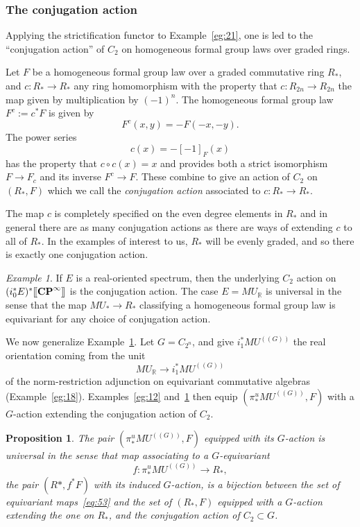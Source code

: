 \documentclass{amsart}
\newtheorem{prop}[equation]{Proposition}
\theoremstyle{definition}
\theoremstyle{remark}
\newtheorem{eg}[equation]{Example}
\newcommand{\R}{{\mathbb R}}
\newcommand{\LL}{[\mkern-2mu[}
\newcommand{\RR}{]\mkern-2mu]}
\newcommand{\cp}{\mathbf{CP}}
\newcommand{\mur}{MU_{\R}}
\newcommand{\mutn}[1]{MU^{(\!(#1)\!)}}
\newcommand{\piu}{\pi^{u}}
\newcommand{\zt}{C_{2}}
\newcommand{\ztn}{C_{2^{n}}}
\newcommand{\mustar}{MU_{\ast}}
\begin{document}
\subsubsection{The conjugation action}
\label{sec:conjugation-action}

Applying the strictification functor to Example~\ref{eg:21}, one is
led to the ``conjugation action'' of $\zt$ on homogeneous formal group
laws over graded rings.

Let $F$ be a homogeneous formal group law over a graded
commutative ring $R_{\ast}$, and $c:R_{\ast}\to R_{\ast}$ any ring
homomorphism with the property that $c:R_{2n}\to R_{2n}$ the map given
by multiplication by $(-1)^{n}$.  The homogeneous formal group law
$F^{c}:= c^{\ast}F$ is given by
\[
F^{c}(x,y) = - F(-x, -y).
\]
The power series
\[
c(x) = - [-1]_{F}(x)
\]
has the property that $c\circ c(x)=x$ and provides both a strict
isomorphism $F\to F_{c}$ and its inverse $F^{c}\to F$.  These combine
to give an action of $\zt$ on $(R_{\ast},F)$ which we call the {\em
conjugation action} associated to $c:R_{\ast}\to R_{\ast}$.


The map $c$ is completely specified on the even degree elements in
$R_{\ast}$ and in general there are as many conjugation actions as
there are ways of extending $c$ to all of $R_{\ast}$.  In the examples
of interest to us, $R_{\ast}$ will be evenly graded, and so there is
exactly one conjugation action.


\begin{eg}
\label{eg:22} 
If $E$ is a real-oriented spectrum, then the underlying
$\zt$ action on $(i_{0}^{\ast}E)^{\ast}\LL \cp^{\infty}\RR$ is the
conjugation action.  The case $E=\mur$ is universal in the sense that
the map $\mustar\to R_{\ast}$ classifying a homogeneous formal group
law is equivariant for any choice of conjugation action.
\end{eg}

We now generalize Example~\ref{eg:22}.  Let $G=\ztn$, and give
$i_{1}^{\ast}\mutn{G}$ the real orientation coming from the unit
\[
\mur\to i_{1}^{\ast}\mutn{G}
\]
of the norm-restriction adjunction on equivariant commutative
algebras (Example~\ref{eg:18}).   Examples~\ref{eg:12}
and~\ref{eg:22} then equip  $(\piu_{\ast}\mutn{G}, F)$ with a
$G$-action extending the conjugation action of $\zt$.   

\begin{prop}
\label{thm:240} The pair $(\piu_{\ast}\mutn{G},F)$ equipped with its
$G$-action is {\em universal} in the sense that map associating to a
$G$-equivariant
\begin{equation}
\label{eq:53}
f:\piu_{\ast}\mutn{G} \to R_{\ast},
\end{equation}
the pair $(R\ast,f^{\ast}F)$ with its induced $G$-action, is a
bijection between the set of equivariant maps~\eqref{eq:53} and the set of
$(R_{\ast},F)$ equipped with a $G$-action extending the one on
$R_{\ast}$, and the conjugation action of $\zt\subset G$.  
\end{prop}
\end{document}
